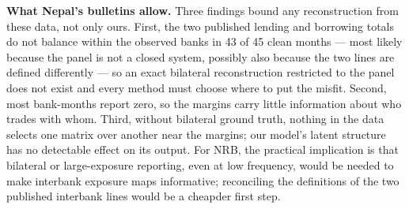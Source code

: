 \documentclass[
  a4paper,
]{article}
\begin{document}
\textbf{What Nepal's bulletins allow.} Three findings bound any
reconstruction from these data, not only ours. First, the two published
lending and borrowing totals do not balance within the observed banks in
43 of 45 clean months --- most likely because the panel is not a closed
system, possibly also because the two lines are defined differently ---
so an exact bilateral reconstruction restricted to the panel does not
exist and every method must choose where to put the misfit. Second, most
bank-months report zero, so the margins carry little information about
who trades with whom. Third, without bilateral ground truth, nothing in
the data selects one matrix over another near the margins; our model's
latent structure has no detectable effect on its output. For NRB, the
practical implication is that bilateral or large-exposure reporting,
even at low frequency, would be needed to make interbank exposure maps
informative; reconciling the definitions of the two published interbank
lines would be a cheapder first step.
\end{document}
